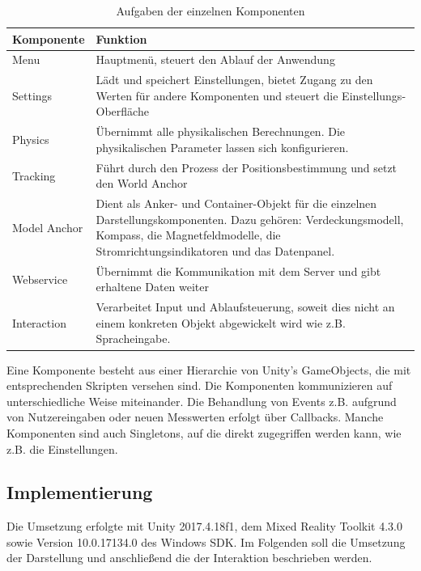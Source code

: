 \bgroup
\setlength\extrarowheight{-2pt}
\def\arraystretch{2}
\begin{table}[H]
	\centering
	\begin{tabular}{m{2.5cm}|m{8cm}}
		Komponente & Funktion\\
		\hline
		\hline
		Menu & Hauptmenü, steuert den Ablauf der Anwendung\\
		\hline
		Settings & Lädt und speichert Einstellungen, bietet Zugang zu den Werten für andere Komponenten und steuert die Einstellungs-Oberfläche\\
		\hline
		Physics & Übernimmt alle physikalischen Berechnungen. Die physikalischen Parameter lassen sich konfigurieren.\\
		\hline
		Tracking & Führt durch den Prozess der Positionsbestimmung und setzt den World Anchor\\
		\hline
		Model Anchor & Dient als Anker- und Container-Objekt für die einzelnen Darstellungskomponenten. Dazu gehören: Verdeckungsmodell, Kompass, die Magnetfeldmodelle, die Stromrichtungsindikatoren und das Datenpanel.\\
		\hline
		Webservice & Übernimmt die Kommunikation mit dem Server und gibt erhaltene Daten weiter\\
		\hline
		Interaction & Verarbeitet Input und Ablaufsteuerung, soweit dies nicht an einem konkreten Objekt abgewickelt wird wie z.B. Spracheingabe.\\
	\end{tabular}\caption{\label{tab:components-details} Aufgaben der einzelnen Komponenten}
\end{table}
\egroup

Eine Komponente besteht aus einer Hierarchie von Unity's GameObjects, die mit entsprechenden Skripten versehen sind. Die Komponenten kommunizieren auf unterschiedliche Weise miteinander. Die Behandlung von Events z.B. aufgrund von Nutzereingaben oder neuen Messwerten erfolgt über Callbacks. Manche Komponenten sind auch Singletons, auf die direkt zugegriffen werden kann, wie z.B. die Einstellungen.

\subsection{Implementierung}
\label{sec-5-2}
Die Umsetzung erfolgte mit Unity 2017.4.18f1, dem Mixed Reality Toolkit 4.3.0 sowie Version 10.0.17134.0 des Windows SDK. Im Folgenden soll die Umsetzung der Darstellung und anschließend die der Interaktion beschrieben werden.

